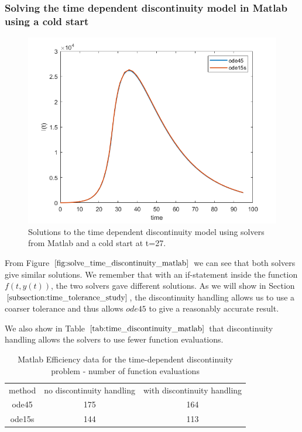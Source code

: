 \subsubsection{Solving the time dependent discontinuity model in Matlab using a cold start}
\begin{figure}[H]
\centering
\includegraphics[width=0.7\linewidth]{./figures/solve_time_discontinuity_matlab}
\caption{Solutions to the time dependent discontinuity model using solvers from Matlab and a cold start at t=27.}
\label{fig:solve_time_discontinuity_matlab}
\end{figure}

From Figure $\ref{fig:solve_time_discontinuity_matlab}$ we can see that both solvers give similar solutions. We remember that with an if-statement inside the function $f(t, y(t))$, the two solvers gave different solutions. As we will show in Section $\ref{subsection:time_tolerance_study}$, the discontinuity handling allows us to use a coarser tolerance and thus allows $ode45$ to give a reasonably accurate result.

We also show in Table $\ref{tab:time_discontinuity_matlab}$ that discontinuity handling allows the solvers to use fewer function evaluations.

\begin{table}[H]
\caption {Matlab Efficiency data for the time-dependent discontinuity problem - number of function evaluations} 
\label{tab:time_discontinuity_matlab} 
\begin{center}
\begin{tabular}{ c c c }
method & no discontinuity handling & with discontinuity handling \\ 
ode45 & 175 & 164 \\
ode15s & 144 & 113 \\
\end{tabular}
\end{center}
\end{table}

